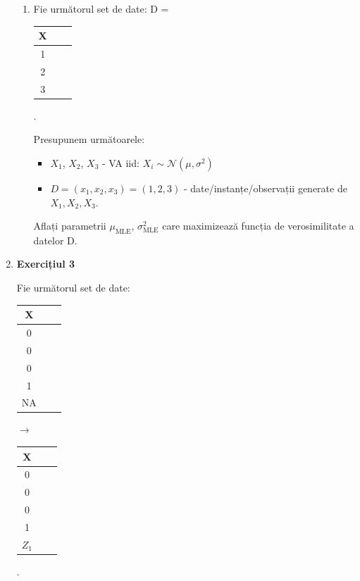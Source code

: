 \documentclass[12pt]{article}
\begin{document}
\begin{enumerate}
\begin{enumerate}
			\item 	Fie următorul set de date: D =
			\begin{tabular}{ |c|c|c| } 
				\hline
				X \\ 
				\hline
				1 \\ 
				2 \\ 
				3 \\
				\hline
			\end{tabular}. 
			
			Presupunem următoarele:
			\begin{itemize}
				\item $X_1$, $X_2$, $X_3$ - VA iid: $X_i \sim \mathcal{N}(\mu,\sigma^2)$
				\item $D=(x_1,x_2,x_3) = (1,2,3)$ - date/instanțe/observații generate de $X_1,X_2,X_3$.
			\end{itemize}
			Aflați parametrii $\mu_\text{MLE}$, $\sigma^2_\text{MLE}$ care maximizează funcția de verosimilitate a datelor D.
		\end{enumerate}

		\item \textbf{Exercițiul 3}
		
		Fie următorul set de date:
		\begin{tabular}{ |c|c|c| } 
			\hline
			X \\ 
			\hline
			0 \\ 
			0 \\ 
			0 \\
			1\\
			NA\\
			\hline
		\end{tabular} $\rightarrow$ \begin{tabular}{ |c|c|c| } 
		\hline
		X \\ 
		\hline
		0 \\ 
		0 \\ 
		0 \\
		1\\
		$Z_1$\\
		\hline
	\end{tabular}. 
		

\end{enumerate}
\end{document}
